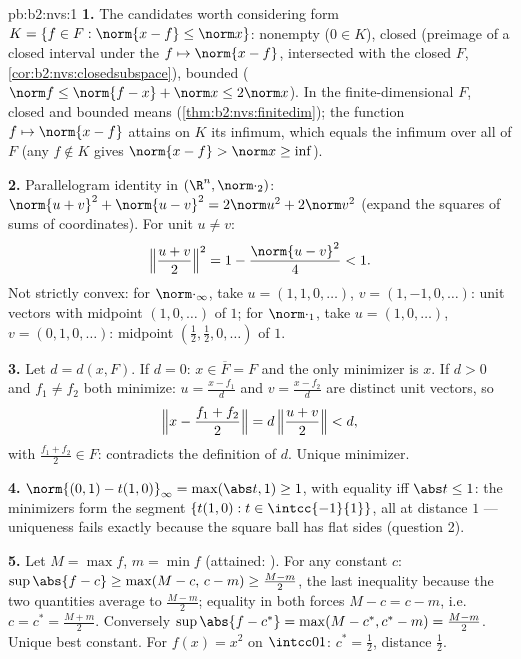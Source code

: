 \begin{solution}{pb:b2:nvs:1}
\textbf{1.} The candidates worth considering form $K = \{f \in F
: \norm{x - f} \leq \norm x\}$: nonempty ($0 \in K$), closed
(preimage of a closed interval under the  $f \mapsto
\norm{x - f}$, intersected with the closed $F$,
\cref{cor:b2:nvs:closedsubspace}), bounded ($\norm f \leq
\norm{f - x} + \norm x \leq 2\norm x$). In the
finite-dimensional $F$, closed and bounded means 
(\cref{thm:b2:nvs:finitedim}); the  function $f
\mapsto \norm{x - f}$ attains on $K$ its infimum, which equals
the infimum over all of $F$ (any $f \notin K$ gives $\norm{x -
f} > \norm x \geq \inf$).

\textbf{2.} Parallelogram identity in $(\R^n,
\norm\cdot_2)$: $\norm{u + v}^2 + \norm{u - v}^2 = 2\norm u^2 +
2\norm v^2$ (expand the squares of sums of coordinates). For
unit $u \neq v$:
\[
\Bigl\Vert\frac{u+v}2\Bigr\Vert^2 = 1 - \frac{\norm{u -
v}^2}{4} < 1 .
\]
Not strictly convex: for $\norm\cdot_\infty$, take $u = (1, 1, 0,
\dots)$, $v = (1, -1, 0, \dots)$: unit vectors with midpoint
$(1, 0, \dots)$ of  $1$; for $\norm\cdot_1$, take $u = (1,
0, \dots)$, $v = (0, 1, 0, \dots)$: midpoint $(\frac12,
\frac12, 0, \dots)$ of  $1$.

\textbf{3.} Let $d = d(x, F)$. If $d = 0$: $x \in \overline F =
F$ and the only minimizer is $x$. If $d > 0$ and $f_1 \neq f_2$
both minimize: $u = \frac{x - f_1}{d}$ and $v = \frac{x -
f_2}{d}$ are distinct unit vectors, so
\[
\Bigl\Vert x - \frac{f_1 + f_2}2\Bigr\Vert
= d\,\Bigl\Vert\frac{u + v}2\Bigr\Vert < d ,
\]
with $\frac{f_1 + f_2}2 \in F$: contradicts the definition of
$d$. Unique minimizer.

\textbf{4.} $\norm{(0,1) - t(1,0)}_\infty = \max(\abs t, 1)
\geq 1$, with equality iff $\abs t \leq 1$: the minimizers form
the segment $\{t(1, 0) : t \in \intcc{-1}{1}\}$, all at distance
$1$ --- uniqueness fails exactly because the square ball has
flat sides (question 2).

\textbf{5.} Let $M = \max f$, $m = \min f$ (attained:
). For any constant $c$: $\sup\abs{f - c} \geq
\max(M - c,\, c - m) \geq \frac{M - m}2$, the last inequality
because the two quantities average to $\frac{M-m}2$; equality in
both forces $M - c = c - m$, i.e.\ $c = c^* = \frac{M + m}2$.
Conversely $\sup\abs{f - c^*} = \max(M - c^*, c^* - m) =
\frac{M - m}2$. Unique best constant. For $f(x) = x^2$ on
$\intcc01$: $c^* = \frac12$, distance $\frac12$.


\end{solution}
